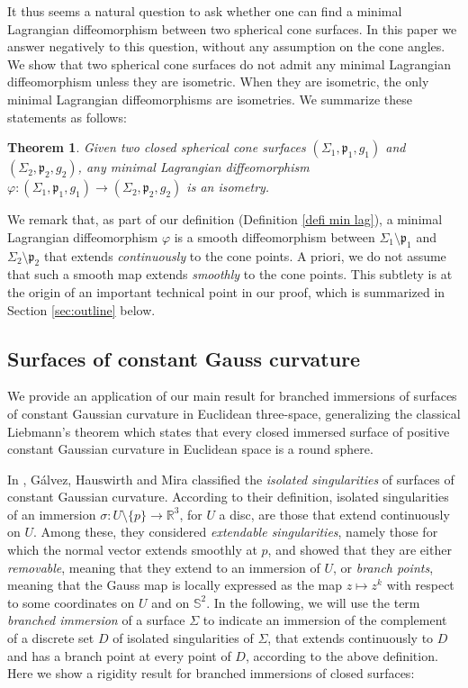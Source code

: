 \documentclass[11pt]{article}
\newtheorem{theorem}[cor]{Theorem}
\theoremstyle{definition}
\newcommand{\R}{{\mathbb R}}
\begin{document}
It thus seems a natural question to ask whether one can find a minimal Lagrangian diffeomorphism between two spherical cone surfaces. In this paper we answer negatively to this question, without any assumption on the cone angles. We show that two spherical cone surfaces do not admit any minimal Lagrangian diffeomorphism unless they are isometric. When they are isometric, the only minimal Lagrangian diffeomorphisms are isometries. We summarize these statements as follows:

\begin{theorem}\label{thm:main1}
Given two closed spherical cone surfaces $(\Sigma_1,\mathfrak p_1,g_1)$ and $(\Sigma_2,\mathfrak p_2,g_2)$, any minimal Lagrangian diffeomorphism $\varphi:(\Sigma_1,\mathfrak p_1,g_1)\to(\Sigma_2,\mathfrak p_2,g_2)$ is an isometry.
\end{theorem}

We remark that, as part of our definition (Definition \ref{defi min lag}), a minimal Lagrangian diffeomorphism $\varphi$ is a smooth diffeomorphism between $\Sigma_1\setminus\mathfrak p_1$ and $\Sigma_2\setminus\mathfrak p_2$ that extends \emph{continuously} to the cone points. A priori, we do not assume that such a smooth map extends \emph{smoothly} to the cone points. This subtlety is at the origin of an important technical point in our proof, which is summarized in Section \ref{sec:outline} below.

\subsection{Surfaces of constant Gauss curvature}

We provide an application of our main result for branched immersions of surfaces of constant Gaussian curvature in Euclidean three-space, generalizing the classical Liebmann's theorem which states that every closed immersed surface of positive constant Gaussian curvature in Euclidean space is a round sphere.

In \cite{zbMATH06243957}, Gálvez, Hauswirth and Mira classified the \emph{isolated singularities} of surfaces of constant Gaussian curvature. According to their definition, isolated singularities of an immersion $\sigma:U\setminus\{p\}\to\R^3$, for $U$ a disc, are those that extend continuously on $U$. Among these, they considered \emph{extendable singularities}, namely those for which the normal vector extends smoothly at $p$, and showed that they are either \emph{removable}, meaning that they extend to an immersion of $U$, or \emph{branch points}, meaning that the Gauss map is locally expressed as the map $z\mapsto z^k$ with respect to some coordinates on $U$ and on $\mathbb S^2$. {In the following, we will use the term \emph{branched immersion} of a surface $\Sigma$ to indicate an immersion of the complement of a discrete set $D$ {of isolated singularities} of $\Sigma$, that extends continuously to $D$ and has a branch point at every point of $D$, according to the above definition.} Here we show a rigidity result for branched immersions of closed surfaces:
\end{document}
